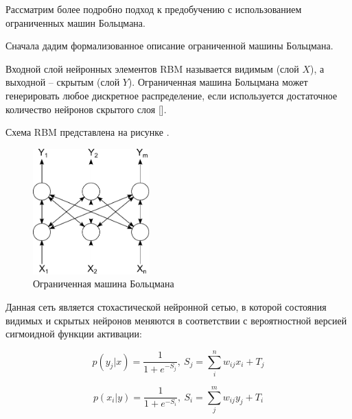 Рассматрим более подробно подход к предобучению с использованием ограниченных машин Больцмана.

Сначала дадим формализованное описание ограниченной машины Больцмана.

\begin{SCn}
\end{SCn}

Входной слой нейронных элементов RBM называется видимым (слой $X$), а выходной -- скрытым (слой $Y$). Ограниченная машина Больцмана может генерировать любое дискретное распределение, если используется достаточное количество нейронов скрытого слоя [].

Схема RBM представлена на рисунке \textit{}.

\begin{figure}[H]
	\includegraphics[width=0.4\textwidth]{author/part3/figures/pic1-3.pdf}
	\caption{Ограниченная машина Больцмана}
	\label{fig:rbm_scheme}
\end{figure}

Данная сеть является стохастической нейронной сетью, в которой состояния видимых и скрытых нейронов меняются в соответствии с вероятностной версией сигмоидной функции активации:

\begin{equation}
	p(y_j\lvert x)=\frac{1}{1+e^{-S_j}},\ S_j=\sum_i^n w_{ij}x_i+T_j
\end{equation}

\begin{equation}
	p(x_i\lvert y)=\frac{1}{1+e^{-S_i}},\ S_i=\sum_j^m w_{ij}y_j+T_i
\end{equation}

